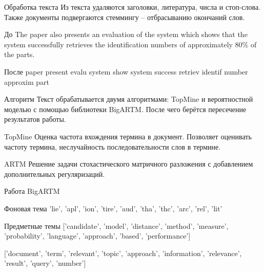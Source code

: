 \documentclass{beamer}
\begin{document}
\begin{frame}{Обработка текста}
Из текста удаляются заголовки, литература, числа и стоп-слова. Также документы подвергаются стеммингу -- отбрасыванию окончаний слов.

\begin{block}{До}
The paper also presents an evaluation of the system 
which shows that the system successfully retrieves the identification numbers of approximately 80\% of the parts.
\end{block}

\begin{block}{После}
paper present evalu system show system success retriev identif number approxim part
\end{block}
\end{frame}

\begin{frame}{Алгоритм}
Текст обрабатывается двумя алгоритмами: TopMine и вероятностной моделью с помощью библиотеки BigARTM. После чего берётся пересечение результатов работы.

\begin{block}{TopMine}
Оценка частота вхождения термина в документ. Позволяет оценивать частоту термина, неслучайность последовательности слов в термине.
\end{block}

\begin{block}{ARTM}
Решение задачи стохастического матричного разложения с добавлением дополнительных регуляризаций.
\end{block}
\end{frame}

\begin{frame}{Работа BigARTM}
\begin{block}{Фоновая тема}
'lie', 'apl', 'ion', 'tire', 'aud', 'tha', 'thc', 'arc', 'rel', 'lit'
\end{block}

\begin{block}{Предметные темы}
['candidate', 'model', 'distance', 'method', 'measure', 'probability', 'language', 'approach', 'based', 'performance']

['document', 'term', 'relevant', 'topic', 'approach', 'information', 'relevance', 'result', 'query', 'number']
\end{block}
\end{frame}
\end{document}
